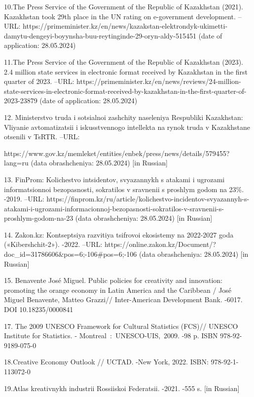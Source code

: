 \begin{noparindent}
10.The Press Service of the Government of the Republic of Kazakhstan
  (2021). Kazakhstan took 29th place in the UN rating on e-government
  development. --URL:
  https://primeminister.kz/en/news/kazakstan-elektrondyk-ukimetti-damytu-dengeyi-boyynsha-buu-reytinginde-29-oryn-aldy-515451
  (date of application: 28.05.2024)

11.The Press Service of the Government of the Republic of Kazakhstan
  (2023). 2.4 million state services in electronic format received by
  Kazakhstan in the first quarter of 2023. --URL:
  https://primeminister.kz/en/news/reviews/24-million-state-services-in-electronic-format-received-by-kazakhstan-in-the-first-quarter-of-2023-23879
  (date of application: 28.05.2024)

12. Ministerstvo truda i sotsial\textquotesingle noi zashchity naseleniya
Respubliki Kazakhstan: Vliyanie avtomatizatsii i iskusstvennogo
intellekta na rynok truda v Kazakhstane otsenili v TsRTR. --URL:

https://www.gov.kz/memleket/entities/enbek/press/news/details/579455?lang=ru
(data obrashcheniya: 28.05.2024) {[}in Russian{]}

13. FinProm: Kolichestvo intsidentov, svyazannykh s atakami i ugrozami
informatsionnoi bezopasnosti, sokratilos\textquotesingle{} v sravnenii s
proshlym godom na 23\%. -2019. --URL:
https://finprom.kz/ru/article/kolichestvo-incidentov-svyazannyh-s-atakami-i-ugrozami-informacionnoj-bezopasnosti-sokratilos-v-sravnenii-s-proshlym-godom-na-23
(data obrashcheniya: 28.05.2024) {[}in Russian{]}

14. Zakon.kz: Kontseptsiya razvitiya tsifrovoi ekosistemy na 2022-2027 goda
(«Kibershchit-2»). -2022. --URL:
https://online.zakon.kz/Document/?doc\_id=31786606\&pos=6;-106\#pos=6;-106
(data obrashcheniya: 28.05.2024) {[}in Russian{]}

15. Benavente José Miguel. Public policies for creativity and innovation:
promoting the orange economy in Latin America and the Caribbean / José
Miguel Benavente, Matteo Grazzi// Inter-American Development Bank.
-6017. DOI 10.18235/0000841

17. The 2009 UNESCO Framework for Cultural Statistics (FCS)// UNESCO
Institute for Statistics. - Montreal~:~UNESCO-UIS,~2009. -98 p. ISBN
978-92-9189-075-0

18.Creative Economy Outlook // UCTAD. -New York, 2022. ISBN:
  978-92-1-113072-0

19.Atlas kreativnykh industrii Rossiiskoi Federatsii. -2021. -555 s.
  {[}in Russian{]}


\end{noparindent}
